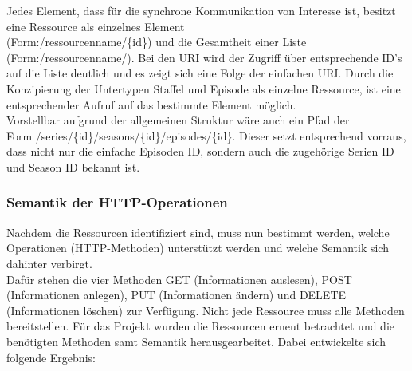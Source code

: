 Jedes Element, dass für die synchrone Kommunikation von Interesse ist, besitzt eine Ressource als einzelnes Element\\
(Form:/ressourcenname/\{id\}) und die Gesamtheit einer Liste (Form:/ressourcenname/). Bei den URI wird der Zugriff über entsprechende ID's auf die Liste deutlich und es zeigt sich eine Folge der einfachen URI. Durch die Konzipierung der Untertypen Staffel und Episode als einzelne Ressource, ist eine entsprechender Aufruf auf das bestimmte Element möglich.\\
Vorstellbar aufgrund der allgemeinen Struktur wäre auch ein Pfad der \\
Form /series/\{id\}/seasons/\{id\}/episodes/\{id\}.  Dieser setzt entsprechend vorraus, dass nicht nur die einfache Episoden ID, sondern auch die zugehörige Serien ID und Season ID bekannt ist.

\subsubsection{Semantik der HTTP-Operationen}

Nachdem die Ressourcen identifiziert sind, muss nun bestimmt werden, welche Operationen (HTTP-Methoden) unterstützt werden und welche Semantik sich dahinter verbirgt.\\
Dafür stehen die vier Methoden GET (Informationen auslesen), POST (Informationen anlegen), PUT (Informationen ändern) und DELETE (Informationen löschen) zur Verfügung. Nicht jede Ressource muss alle Methoden bereitstellen. Für das Projekt wurden die Ressourcen erneut betrachtet und die benötigten Methoden samt Semantik herausgearbeitet. Dabei entwickelte sich folgende Ergebnis:

